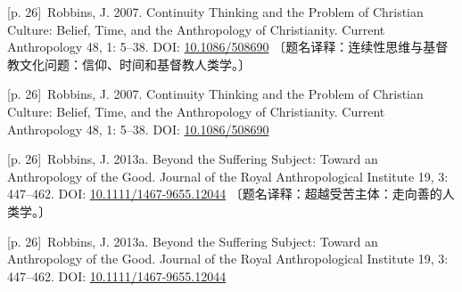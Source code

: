 \documentclass[10pt,a4paper]{article}
\begin{document}
\noindent\begin{minipage}{\textwidth}\begin{minipage}[t]{\dimexpr.5\textwidth-4mm\relax}\noindent\begin{minipage}[t]{\linewidth}{\scriptsize\color{gray} [p. 26]}\ Robbins, J. 2007. Continuity Thinking and the Problem of Christian Culture: Belief, Time, and the Anthropology of Christianity. Current Anthropology 48, 1: 5–38. DOI: \url{10.1086/508690} 〔题名译释：连续性思维与基督教文化问题：信仰、时间和基督教人类学。〕\par\end{minipage}\par\end{minipage}\hfill\begin{minipage}[t]{\dimexpr.5\textwidth-4mm\relax}\noindent\begin{minipage}[t]{\linewidth}{\scriptsize\color{gray} [p. 26]}\ Robbins, J. 2007. Continuity Thinking and the Problem of Christian Culture: Belief, Time, and the Anthropology of Christianity. Current Anthropology 48, 1: 5–38. DOI: \url{10.1086/508690}\par\end{minipage}\par\end{minipage}\end{minipage}\par
\noindent\begin{minipage}{\textwidth}\begin{minipage}[t]{\dimexpr.5\textwidth-4mm\relax}\noindent\begin{minipage}[t]{\linewidth}{\scriptsize\color{gray} [p. 26]}\ Robbins, J. 2013a. Beyond the Suffering Subject: Toward an Anthropology of the Good. Journal of the Royal Anthropological Institute 19, 3: 447–462. DOI: \url{10.1111/1467-9655.12044} 〔题名译释：超越受苦主体：走向善的人类学。〕\par\end{minipage}\par\end{minipage}\hfill\begin{minipage}[t]{\dimexpr.5\textwidth-4mm\relax}\noindent\begin{minipage}[t]{\linewidth}{\scriptsize\color{gray} [p. 26]}\ Robbins, J. 2013a. Beyond the Suffering Subject: Toward an Anthropology of the Good. Journal of the Royal Anthropological Institute 19, 3: 447–462. DOI: \url{10.1111/1467-9655.12044}\par\end{minipage}\par\end{minipage}\end{minipage}\par
\end{document}
